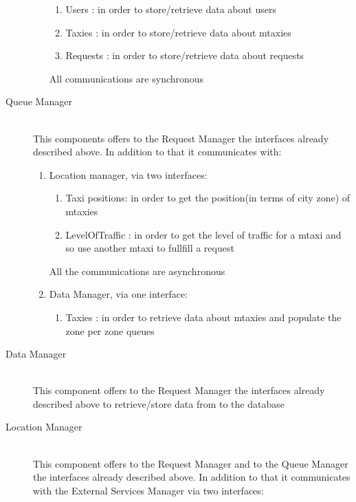 \documentclass[11pt,titlepage]{article} %
\begin{document}
\begin{description}
\begin{enumerate}
		\begin{enumerate}
	               \item Users : in order to store/retrieve data about users
	               \item Taxies : in order to store/retrieve data about mtaxies
	               \item Requests : in order to store/retrieve data about requests
		\end{enumerate}
	 	All communications are synchronous
     \end{enumerate}
      \item [Queue Manager] \hfill \\
          This components offers to the Request Manager the interfaces already described above. In addition to that
          it communicates with:
	\begin{enumerate}
	          \item Location manager, via two interfaces:\newline
		\begin{enumerate}
		            \item Taxi positions: in order to get the position(in terms of city zone) of mtaxies
		            \item LevelOfTraffic : in order to get the level of traffic for a mtaxi and so use another mtaxi
		            to fullfill a request
		\end{enumerate}
		All the communications are asynchronous
	          \item Data Manager, via one interface:
		\begin{enumerate}
	           	\item Taxies : in order to retrieve data about mtaxies and populate the zone per zone queues
		\end{enumerate}
	\end{enumerate}

       \item [Data Manager] \hfill \\
          This component offers to the Request Manager the interfaces already described above to retrieve/store data
          from to the database

      \item [Location Manager] \hfill \\
          This component offers to the Request Manager and to the Queue Manager the interfaces already described above. In addition to that it communicates
          with the External Services Manager via two interfaces:\newline


\end{description}
\end{document}
